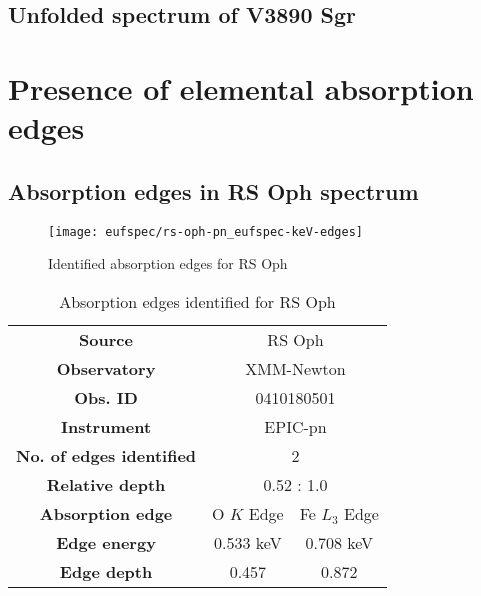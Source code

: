 		\subsection*{Unfolded spectrum of V3890 Sgr}
	
	\newpage
	\section{Presence of elemental absorption edges}
	
		
		\subsection*{Absorption edges in RS Oph spectrum}
			\begin{figure}[h!]
				\centering
				\texttt{[image: eufspec/rs-oph-pn\_eufspec-keV-edges]}
				\caption{Identified absorption edges for RS Oph}
				\label{result:absedge-rs-oph}
			\end{figure}
			
			\renewcommand{\arraystretch}{1.5}
			\begin{table}[!htb]
				\centering
				\caption{Absorption edges identified for RS Oph}
				\label{tab:absedge-rs-oph}
				\begin{tabular}{ccc}
					\hline
					\textbf{Source} & \multicolumn{2}{c}{RS Oph} \\
					\textbf{Observatory} & \multicolumn{2}{c}{XMM-Newton} \\
					\textbf{Obs. ID} & \multicolumn{2}{c}{0410180501} \\
					\textbf{Instrument} & \multicolumn{2}{c}{EPIC-pn} \\
					\textbf{No. of edges identified} & \multicolumn{2}{c}{2} \\
					\textbf{Relative depth} & \multicolumn{2}{c}{0.52 : 1.0} \\
					\hline
					\textbf{Absorption edge} & {O $K$ Edge} & {Fe $L_3$ Edge} \\
					\textbf{Edge energy} & {0.533 keV} & {0.708 keV} \\
					\textbf{Edge depth} & {0.457} & {0.872} \\ \hline
				\end{tabular}
			\end{table}
			\renewcommand{\arraystretch}{2.2}
		
